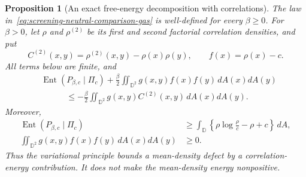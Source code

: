 \documentclass[11pt,a4paper]{article}
\numberwithin{equation}{section}
\newtheorem{proposition}[theorem]{Proposition}
\theoremstyle{definition}
\theoremstyle{remark}
\newcommand{\D}{\mathbb D}
\begin{document}
\begin{proposition}[An exact free-energy decomposition with correlations]
\label{prop:screening-correlation-energy-obstruction}
The law in~\eqref{eq:screening-neutral-comparison-gas} is well-defined
for every $\beta\ge0$.  For $\beta>0$, let $\rho$ and $\rho^{(2)}$
be its first and second factorial correlation densities, and put
\[
 C^{(2)}(x,y)=\rho^{(2)}(x,y)-\rho(x)\rho(y),\qquad
 f(x)=\rho(x)-c.
\]
All terms below are finite, and
\begin{align}
 &\operatorname{Ent}(P_{\beta,c}\mid\Pi_c)
      +\frac\beta2\iint_{\D^2}g(x,y)f(x)f(y)\,dA(x)dA(y)
 \nonumber\\
 &\hspace{3em}\le
       -\frac\beta2\iint_{\D^2}g(x,y)C^{(2)}(x,y)\,dA(x)dA(y).
 \label{eq:screening-free-energy-correlation-cost}
\end{align}
Moreover,
\begin{align}
 \operatorname{Ent}(P_{\beta,c}\mid\Pi_c)
 &\ge\int_\D\left\{\rho\log\frac\rho c-\rho+c\right\}\,dA,
 \label{eq:screening-ideal-entropy-bound}\\
 \iint_{\D^2}g(x,y)f(x)f(y)\,dA(x)dA(y)&\ge0.
 \label{eq:screening-positive-mean-energy}
\end{align}
Thus the variational principle bounds a mean-density defect by a
correlation-energy contribution.  It does not make the mean-density
energy nonpositive.
\end{proposition}
\end{document}
